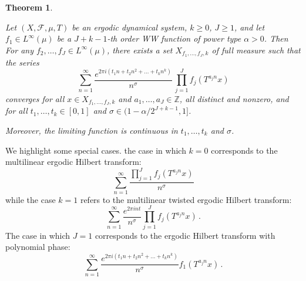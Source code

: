 \documentclass[11pt, oneside]{amsart}   	%
\newcommand{\1}{\mathbbm{1}}
\newtheorem{theorem}{Theorem}[section]
\theoremstyle{definition}
\begin{document}
\begin{theorem}\label{T:HilbertTrans}

Let $(X, \mathcal{F}, \mu, T)$ be an ergodic dynamical system, $k\geq0$, $J\geq 1$, and let $f_1\in L^\infty(\mu)$ be a $J + k - 1$-th order WW function of power type $\alpha > 0$. Then For any $f_2, \dots, f_{J} \in L^\infty(\mu)$,  there exists a set $X_{f_1, \dots, f_{J}, k}$ of full measure such that the series 
$$\sum_{n=1}^\infty \frac{e^{2\pi i \left(t_1 n + t_2 n^2 + \dots + t_k n^k\right)}}{n^\sigma} \, \prod_{j=1}^{J}f_j(T^{a_j n} x)$$
converges for all $x\in X_{f_1, \dots, f_{J}, k}$ and $a_1, \dots, a_{J}\in \mathbb{Z}$, all distinct and nonzero, and for all $t_1, \dots, t_k \in [0, 1]$ and $\sigma\in (1 - \alpha/2^{J+k-1}, 1]$.

Moreover, the limiting function is continuous in $t_1, \dots, t_k$ and $\sigma$.
\end{theorem}
We highlight some special cases. the case in which $k=0$ corresponds to the multilinear ergodic Hilbert transform:
$$\sum_{n=1}^\infty \frac{\prod_{j=1}^{J}f_j(T^{a_j n} x)}{n^\sigma} $$
while the case $k=1$ refers to the multilinear twisted ergodic Hilbert transform:
$$\sum_{n=1}^\infty \frac{e^{2\pi i n t}}{n^\sigma} \prod_{j=1}^{J}f_j(T^{a_j n} x)\, .$$
The case in which $J = 1$ corresponds to the ergodic Hilbert transform with polynomial phase:
$$\sum_{n=1}^\infty \frac{e^{2\pi i \left(t_1 n + t_2n^2 + \dots + t_k n^k\right)}}{n^\sigma} f_1(T^{a_j n} x)\, .$$
\end{document}
